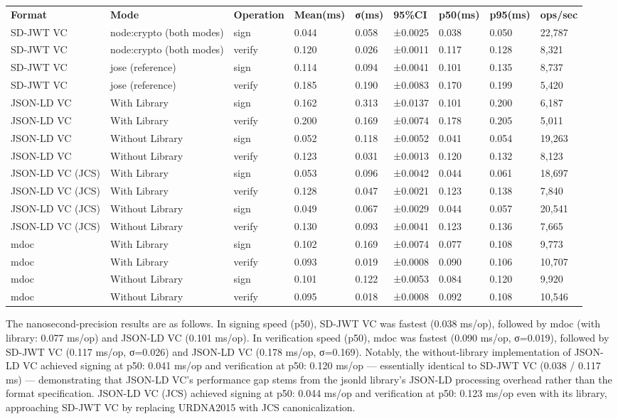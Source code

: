 \begin{longtable}[]{@{}lllllllll@{}}
\toprule
\endhead
\textbf{Format} & \textbf{Mode} & \textbf{Operation} & \textbf{Mean(ms)} & \textbf{σ(ms)} & \textbf{95\%CI} & \textbf{p50(ms)} & \textbf{p95(ms)} & \textbf{ops/sec}\tabularnewline
SD-JWT VC & node:crypto (both modes) & sign & 0.044 & 0.058 & ±0.0025 & 0.038 & 0.050 & 22,787\tabularnewline
SD-JWT VC & node:crypto (both modes) & verify & 0.120 & 0.026 & ±0.0011 & 0.117 & 0.128 & 8,321\tabularnewline
SD-JWT VC & jose (reference) & sign & 0.114 & 0.094 & ±0.0041 & 0.101 & 0.135 & 8,737\tabularnewline
SD-JWT VC & jose (reference) & verify & 0.185 & 0.190 & ±0.0083 & 0.170 & 0.199 & 5,420\tabularnewline
JSON-LD VC & With Library & sign & 0.162 & 0.313 & ±0.0137 & 0.101 & 0.200 & 6,187\tabularnewline
JSON-LD VC & With Library & verify & 0.200 & 0.169 & ±0.0074 & 0.178 & 0.205 & 5,011\tabularnewline
JSON-LD VC & Without Library & sign & 0.052 & 0.118 & ±0.0052 & 0.041 & 0.054 & 19,263\tabularnewline
JSON-LD VC & Without Library & verify & 0.123 & 0.031 & ±0.0013 & 0.120 & 0.132 & 8,123\tabularnewline
JSON-LD VC (JCS) & With Library & sign & 0.053 & 0.096 & ±0.0042 & 0.044 & 0.061 & 18,697\tabularnewline
JSON-LD VC (JCS) & With Library & verify & 0.128 & 0.047 & ±0.0021 & 0.123 & 0.138 & 7,840\tabularnewline
JSON-LD VC (JCS) & Without Library & sign & 0.049 & 0.067 & ±0.0029 & 0.044 & 0.057 & 20,541\tabularnewline
JSON-LD VC (JCS) & Without Library & verify & 0.130 & 0.093 & ±0.0041 & 0.123 & 0.136 & 7,665\tabularnewline
mdoc & With Library & sign & 0.102 & 0.169 & ±0.0074 & 0.077 & 0.108 & 9,773\tabularnewline
mdoc & With Library & verify & 0.093 & 0.019 & ±0.0008 & 0.090 & 0.106 & 10,707\tabularnewline
mdoc & Without Library & sign & 0.101 & 0.122 & ±0.0053 & 0.084 & 0.120 & 9,920\tabularnewline
mdoc & Without Library & verify & 0.095 & 0.018 & ±0.0008 & 0.092 & 0.108 & 10,546\tabularnewline
\bottomrule
\end{longtable}

The nanosecond-precision results are as follows. In signing speed (p50), SD-JWT VC was fastest (0.038 ms/op), followed by mdoc (with library: 0.077 ms/op) and JSON-LD VC (0.101 ms/op). In verification speed (p50), mdoc was fastest (0.090 ms/op, σ=0.019), followed by SD-JWT VC (0.117 ms/op, σ=0.026) and JSON-LD VC (0.178 ms/op, σ=0.169). Notably, the without-library implementation of JSON-LD VC achieved signing at p50: 0.041 ms/op and verification at p50: 0.120 ms/op --- essentially identical to SD-JWT VC (0.038 / 0.117 ms) --- demonstrating that JSON-LD VC's performance gap stems from the jsonld library's JSON-LD processing overhead rather than the format specification. JSON-LD VC (JCS) achieved signing at p50: 0.044 ms/op and verification at p50: 0.123 ms/op even with its library, approaching SD-JWT VC by replacing URDNA2015 with JCS canonicalization.

